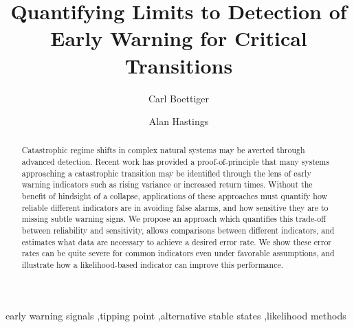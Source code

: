 \documentclass[authoryear,preprint,11pt]{elsarticle}
\begin{document}
\begin{frontmatter}
  \title{Quantifying Limits to Detection of Early Warning for Critical Transitions}
  \author[cpb]{Carl Boettiger}
  \author[esp]{Alan Hastings}
  \address[cpb]{Center for Population Biology, 1 Shields Avenue, University of California, Davis, CA, 95616 United States.}
  \address[esp]{Department of Environmental Science and Policy, University of California, Davis} 


  \begin{abstract}

Catastrophic regime shifts in complex natural systems may be averted through advanced detection. 
Recent work has provided a proof-of-principle that many systems approaching a catastrophic transition may be identified 
through the lens of early warning indicators such as rising variance or increased return times.  
Without the benefit of hindsight of a collapse, 
applications of these approaches must quantify how reliable different indicators are in avoiding false alarms, 
and how sensitive they are to missing subtle warning signs.  
We propose an approach which quantifies this trade-off between reliability and sensitivity, 
allows comparisons between different indicators, 
and estimates what data are necessary to achieve a desired error rate. 
We show these error rates can be quite severe for common indicators even under favorable assumptions, 
and illustrate how a likelihood-based indicator can improve this performance.  

  \end{abstract}

  \begin{keyword}
early warning signals \sep tipping point \sep alternative stable states \sep likelihood methods 
   \end{keyword}
 \end{frontmatter}
\end{document}
